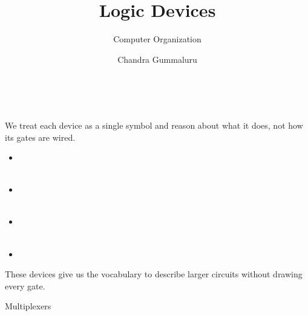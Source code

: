 \documentclass[mathserif, handout]{beamer}
\title{Logic Devices}
\subtitle{Computer Organization}
\author[C. Gummaluru]{Chandra Gummaluru}
\institute[]{\url{chandra-gummaluru.github.io} }
\date[Computer Organization]{}
\begin{document}
\begin{frame}
  \maketitle
\end{frame}

\begin{frame}
  \begin{center}
     \\[2mm]
  \end{center}
\end{frame}

\begin{frame}
  We treat each device as a single symbol and reason about what it does, not how its gates are wired.\\[3mm]
  \begin{itemize}
    \item {}\\
     \\[2mm]
    \item {}\\
     \\[2mm]
    \item {}\\
     \\[2mm]
    \item {}\\
  \end{itemize}
  \vspace{3mm}
These devices give us the vocabulary to describe larger circuits without drawing every gate.
\end{frame}

\begin{frame}{Multiplexers}
  \begin{center}
    \Large {}
  \end{center}
\end{frame}
\end{document}
